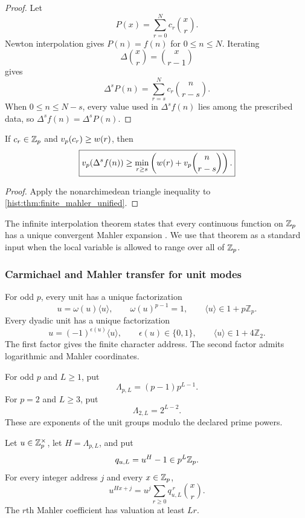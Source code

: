 \begin{proof}
Let
\[
P(x)=\sum_{r=0}^{N}c_r\binom xr.
\]
Newton interpolation gives \(P(n)=f(n)\) for \(0\leq n\leq N\). Iterating
\[
\Delta\binom xr=\binom x{r-1}
\]
gives
\[
\Delta^sP(n)=\sum_{r=s}^{N}c_r\binom n{r-s}.
\]
When \(0\leq n\leq N-s\), every value used in \(\Delta^sf(n)\) lies among the prescribed data, so \(\Delta^sf(n)=\Delta^sP(n)\).
\end{proof}

\begin{histcorollary}\label{hist:cor:mahler_valuation_ledger}
If \(c_r\in\mathbb Z_p\) and \(v_p(c_r)\geq w(r)\), then
\[
\boxed{
v_p(\Delta^sf(n))
\geq
\min_{r\geq s}
\left(
w(r)+v_p\binom n{r-s}
\right).
}
\]
\end{histcorollary}

\begin{proof}
Apply the nonarchimedean triangle inequality to \cref{hist:thm:finite_mahler_unified}.
\end{proof}

The infinite interpolation theorem states that every continuous function on \(\mathbb Z_p\) has a unique convergent Mahler expansion \cite{Mahler1958,Robert2000}. We use that theorem as a standard input when the local variable is allowed to range over all of \(\mathbb Z_p\).

\subsubsection{Carmichael and Mahler transfer for unit modes}

\begin{histstandardfact}\label{hist:fact:local_unit_decomposition}
For odd \(p\), every unit has a unique factorization
\[
u=\omega(u)\langle u\rangle,
\qquad
\omega(u)^{p-1}=1,
\qquad
\langle u\rangle\in1+p\mathbb Z_p.
\]
Every dyadic unit has a unique factorization
\[
u=(-1)^{\epsilon(u)}\langle u\rangle,
\qquad
\epsilon(u)\in\{0,1\},
\qquad
\langle u\rangle\in1+4\mathbb Z_2.
\]
The first factor gives the finite character address. The second factor admits logarithmic and Mahler coordinates.
\end{histstandardfact}

For odd \(p\) and \(L\geq1\), put
\[
\Lambda_{p,L}=(p-1)p^{L-1}.
\]
For \(p=2\) and \(L\geq3\), put
\[
\Lambda_{2,L}=2^{L-2}.
\]
These are exponents of the unit groups modulo the declared prime powers.

\begin{histtheorem}\label{hist:thm:carmichael_mahler_scalar}
Let \(u\in\mathbb Z_p^\times\), let \(H=\Lambda_{p,L}\), and put
\[
q_{u,L}=u^H-1\in p^L\mathbb Z_p.
\]
For every integer address \(j\) and every \(x\in\mathbb Z_p\),
\[
\boxed{
u^{Hx+j}
=
u^j\sum_{r\geq0}q_{u,L}^{\,r}\binom xr.
}
\]
The \(r\)th Mahler coefficient has valuation at least \(Lr\).
\end{histtheorem}

